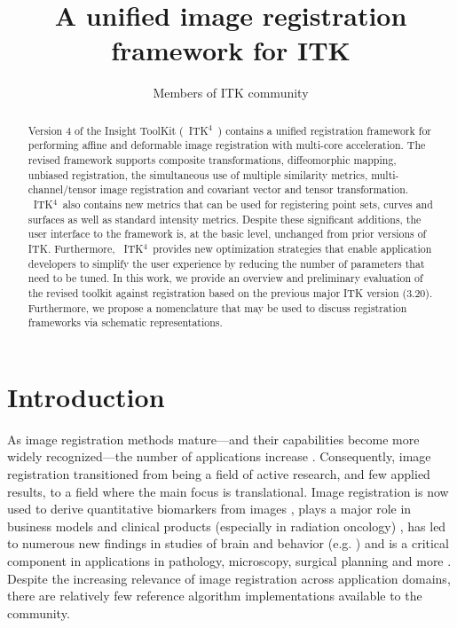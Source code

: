 \documentclass{llncs}
\newcommand{\tk}{~ITK$^{\text{4}}$~}
\begin{document}
\vspace{-0.1in}
\title{A unified image registration framework for ITK}
\author{Members of ITK community}
\maketitle              
\begin{abstract}
Version 4 of the Insight ToolKit (\tk) contains a unified registration
framework for performing affine and deformable image
registration with multi-core acceleration.  The revised framework supports composite
transformations, diffeomorphic mapping, unbiased registration, the simultaneous use of
multiple similarity metrics, multi-channel/tensor image registration
and covariant vector and tensor transformation.  \tk also
contains new metrics that can be used for registering point sets,
curves and surfaces as well as standard intensity metrics.
Despite these significant additions, the user interface to the
framework is, at the basic level, unchanged from prior versions of
ITK.  Furthermore, \tk provides new optimization strategies that enable
application developers to simplify the user experience by reducing the
number of parameters that need to be tuned.  In this work, we provide
an overview and preliminary evaluation of the revised toolkit against
registration based on the previous major ITK
version (3.20).  Furthermore, we propose a nomenclature that may be used to discuss
registration frameworks via schematic representations.
\end{abstract}

\section{Introduction}
As image registration methods mature---and their capabilities become
more widely recognized---the number of applications increase
\cite{Rueckert1999,2004,Shelton2005,Miller2005,Chen2008,Cheung2009,Baloch2009,Peyrat2010,Metz2011,Kikinis2011,Fedorov2011,Murphy2011}.
Consequently, image registration transitioned from being a field of active research, and few applied results, to a
field where the main focus is translational.  Image registration is
now used to derive quantitative biomarkers from images
\cite{Jack2010a}, plays a major role in business models and clinical
products (especially in radiation oncology) \cite{Cheung2009}, has led
to numerous new findings in studies of brain and behavior (e.g. \cite{Bearden2007}) and is a critical component in applications in
pathology, microscopy, surgical planning and more
\cite{Shelton2005,Miller2005,Floca2007,Chen2008,Cheung2009,Peyrat2010,Kikinis2011,Murphy2011}.
Despite the increasing relevance of image registration across
application domains, there are relatively few reference algorithm
implementations available to the community.
\end{document}
